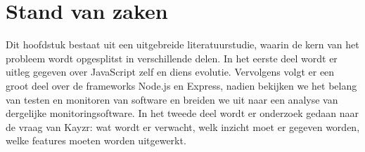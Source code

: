 \chapter{Stand van zaken}
\label{ch:stand-van-zaken}


%
%
%


Dit hoofdstuk bestaat uit een uitgebreide literatuurstudie, waarin de kern van het probleem wordt opgesplitst in verschillende delen. In het eerste deel wordt er uitleg gegeven over JavaScript zelf en diens evolutie. Vervolgens volgt er een groot deel over de frameworks Node.js en Express, nadien bekijken we het belang van testen en monitoren van software en breiden we uit naar een analyse van dergelijke monitoringsoftware. In het tweede deel wordt er onderzoek gedaan naar de vraag van Kayzr: wat wordt er verwacht, welk inzicht moet er gegeven worden, welke features moeten worden uitgewerkt. 

